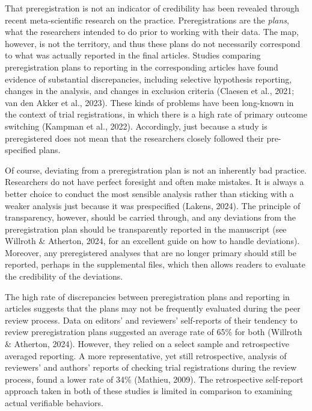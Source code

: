 \documentclass[authordate, meta]{jote-new-article}
\begin{document}
	That preregistration is not an indicator of credibility has been revealed through recent meta-scientific research on the practice. Preregistrations are the \emph{plans}, what the researchers intended to do prior to working with their data. The map, however, is not the territory, and thus these plans do not necessarily correspond to what was actually reported in the final articles. Studies comparing preregistration plans to reporting in the corresponding articles have found evidence of substantial discrepancies, including selective hypothesis reporting, changes in the analysis, and changes in exclusion criteria (Claesen et al., 2021; van den Akker et al., 2023). These kinds of problems have been long-known in the context of trial registrations, in which there is a high rate of primary outcome switching (Kampman et al., 2022). Accordingly, just because a study is preregistered does not mean that the researchers closely followed their pre-specified plans.



	Of course, deviating from a preregistration plan is not an inherently bad practice. Researchers do not have perfect foresight and often make mistakes. It is always a better choice to conduct the most sensible analysis rather than sticking with a weaker analysis just because it was prespecified (Lakens, 2024). The principle of transparency, however, should be carried through, and any deviations from the preregistration plan should be transparently reported in the manuscript (see Willroth \& Atherton, 2024, for an excellent guide on how to handle deviations). Moreover, any preregistered analyses that are no longer primary should still be reported, perhaps in the supplemental files, which then allows readers to evaluate the credibility of the deviations.



	The high rate of discrepancies between preregistration plans and reporting in articles suggests that the plans may not be frequently evaluated during the peer review process. Data on editors' and reviewers' self-reports of their tendency to review preregistration plans suggested an average rate of 65\% for both (Willroth \& Atherton, 2024). However, they relied on a select sample and retrospective averaged reporting. A more representative, yet still retrospective, analysis of reviewers' and authors' reports of checking trial registrations during the review process, found a lower rate of 34\% (Mathieu, 2009). The retrospective self-report approach taken in both of these studies is limited in comparison to examining actual verifiable behaviors.
\end{document}
